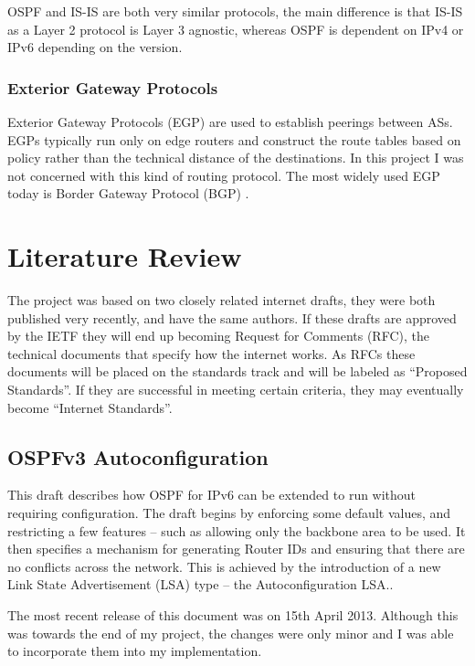 \documentclass[12pt]{report}
\begin{document}
OSPF and IS-IS are both very similar protocols, the main difference is that
IS-IS as a Layer 2 protocol is Layer 3 agnostic, whereas OSPF is dependent on
IPv4 or IPv6 depending on the version.

\subsection{Exterior Gateway Protocols}
Exterior Gateway Protocols (EGP) 
are used to establish peerings between ASs. EGPs typically run only on edge
routers and construct the route tables based on policy rather than the
technical distance of the destinations. In this project I was not concerned
with this kind of routing protocol.  The most widely used EGP today is Border
Gateway Protocol (BGP) .

\chapter{Literature Review} 
The project was based on two closely related internet drafts, they were both
published very recently, and have the same authors. If these drafts are
approved by the IETF they will end up becoming Request for Comments
(RFC), the technical documents that
specify how the internet works. As RFCs these documents will be placed on the
standards track and will be labeled as ``Proposed Standards''. If they are
successful in meeting certain criteria, they may eventually become ``Internet
Standards''\cite{rfc6410}.

\section{OSPFv3 Autoconfiguration}
This draft\cite{draft-ietf-ospf-ospfv3-autoconfig-02} describes how OSPF for
IPv6 can be extended to run without requiring configuration. The draft begins
by enforcing some default values, and restricting a few features -- such as
allowing only the backbone area to be used. It then specifies a mechanism for
generating Router IDs and ensuring that there are no conflicts across the
network. This is achieved by the introduction of a new Link State Advertisement
(LSA)  type -- the Autoconfiguration LSA.. 

The most recent release of this document was on 15th April 2013. Although this
was towards the end of my project, the changes were only minor and I was able
to incorporate them into my implementation.
\end{document}
